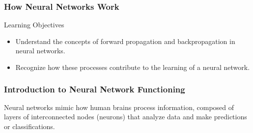 \documentclass[aspectratio=169]{beamer}
\begin{document}
\begin{frame}[fragile]
    \frametitle{How Neural Networks Work}
    \begin{block}{Learning Objectives}
        \begin{itemize}
            \item Understand the concepts of forward propagation and backpropagation in neural networks.
            \item Recognize how these processes contribute to the learning of a neural network.
        \end{itemize}
    \end{block}
\end{frame}

\begin{frame}[fragile]
    \frametitle{Introduction to Neural Network Functioning}
    Neural networks mimic how human brains process information, composed of layers of interconnected nodes (neurons) that analyze data and make predictions or classifications.
\end{frame}
\end{document}
